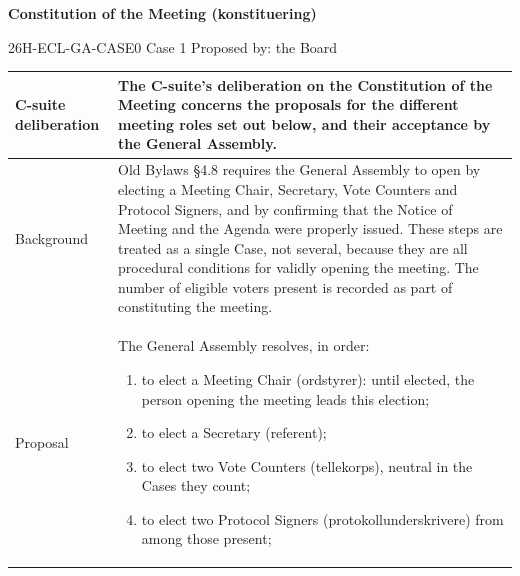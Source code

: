 \documentclass{../../../Common/Latex/Templates/rapport}
\begin{document}
\reportmainmatter
\small
\setlength{\parindent}{0pt}
\setlength{\tabcolsep}{6pt}
\renewcommand{\arraystretch}{1.2}

\begin{center}
  {\Large\bfseries Constitution of the Meeting (konstituering)}\par
  \vspace{0.15cm}
  {\normalsize 26H-ECL-GA-CASE0 \textperiodcentered{} Case 1 \textperiodcentered{} Proposed by: the Board}\par
  \vspace{0.1cm}
  {\small \meetingline}\par
\end{center}

\vspace{0.3cm}
\begin{tabularx}{\textwidth}{|>{\bfseries\raggedright\arraybackslash}p{4.2cm}|X|}
  \hline
  C-suite deliberation & The C-suite's deliberation on the Constitution of the Meeting concerns the proposals for the different meeting roles set out below, and their acceptance by the General Assembly.                                                                                                                                                                                                                                                              \\
  \hline
  Background           & Old Bylaws \S4.8 requires the General Assembly to open by electing a Meeting Chair, Secretary, Vote Counters and Protocol Signers, and by confirming that the Notice of Meeting and the Agenda were properly issued. These steps are treated as a single Case, not several, because they are all procedural conditions for validly opening the meeting. The number of eligible voters present is recorded as part of constituting the meeting. \\
  \hline
  Proposal             & The General Assembly resolves, in order:
  \begin{enumerate}[label=(\alph*), leftmargin=1.4em, itemsep=0.25em, topsep=0.2em]
    \item to elect a Meeting Chair (ordstyrer): until elected, the person opening the meeting leads this election;
    \item to elect a Secretary (referent);
    \item to elect two Vote Counters (tellekorps), neutral in the Cases they count;
    \item to elect two Protocol Signers (protokollunderskrivere) from among those present;

\end{enumerate}
\end{tabularx}
\end{document}
